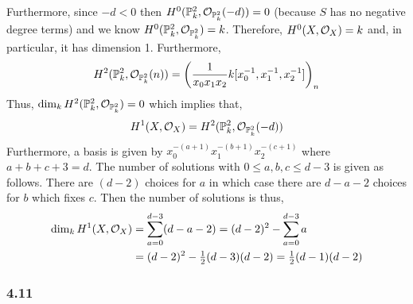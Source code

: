 \documentclass[12pt]{article}
\begin{document}
\begin{center}
\end{center}
Furthermore, since $-d < 0$ then $H^0(\mathbb{P}^2_k, \mathcal{O}_{\mathbb{P}^2_k}(-d)) = 0$ (because $S$ has no negative degree terms) and we know $H^0(\mathbb{P}^2_k, \mathcal{O}_{\mathbb{P}^2_k}) = k$. Therefore, $H^0(X, \mathcal{O}_{X}) = k$ and, in particular, it has dimension 1. Furthermore, 
\[ H^2(\mathbb{P}^2_k, \mathcal{O}_{\mathbb{P}^2_k}(n)) = \left( \frac{1}{x_0 x_1 x_2} k[x_0^{-1}, x_1^{-1}, x_2^{-1}] \right)_n \]
Thus, $\dim_k H^2(\mathbb{P}^2_k, \mathcal{O}_{\mathbb{P}^2_k}) = 0$ which implies that,
\[ H^1(X, \mathcal{O}_{X}) = H^2(\mathbb{P}^2_k, \mathcal{O}_{\mathbb{P}^2_k}(-d)) \]
Furthermore, a basis is given by $x_0^{-(a + 1)} x_1^{-(b + 1)} x_2^{-(c + 1)}$ where $a + b + c + 3 = d$. The number of solutions with $0 \le a,b,c \le d - 3$ is given as follows. There are $(d - 2)$ choices for $a$ in which case there are $d - a - 2$ choices for $b$ which fixes $c$. Then the number of solutions is thus,
\begin{align*}
\dim_k H^1(X, \mathcal{O}_{X}) & = \sum_{a = 0}^{d - 3} (d - a - 2) = (d - 2)^2 - \sum_{a = 0}^{d - 3} a 
\\
& = (d - 2)^2 - \tfrac{1}{2} (d - 3)(d - 2) = \tfrac{1}{2} (d - 1)(d - 2)
\end{align*}

\subsubsection{4.11}
\end{document}
